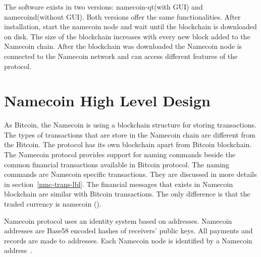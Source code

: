 The software exists in two versions: namecoin-qt(with GUI) and namecoind(without GUI). Both versions offer the same functionalities.
After installation, start the namecoin node and wait until the blockchain is downloaded on disk. The size of the blockchain increases with every new block added to the Namecoin chain.
After the blockchain was downloaded the Namecoin node is connected to the Namecoin network and can access different features of the protocol.

\section{Namecoin High Level Design}
\label{nmc-design-lbl}
As Bitcoin, the Namecoin is using a blockchain structure for storing transactions. The types of transactions that are store in the Namecoin chain are different from the Bitcoin. The protocol has its own blockchain apart from Bitcoin blockchain.
The Namecoin protocol provides support for naming commands beside the common financial transactions available in Bitcoin protocol.
The naming commands are Namecoin specific transactions. They are discussed in more details in section~\ref{nmc-trans-lbl}. 
The financial messages that exists in Namecoin blockchain are similar with Bitcoin transactions. The only difference is that the traded currency is namecoin ().

Namecoin protocol uses an identity system based on addresses. Namecoin addresses are Base58 encoded hashes of receivers’ public keys. All payments and records are made to addresses. Each Namecoin node is identified by a Namecoin address~\cite{digitalsignature}.

